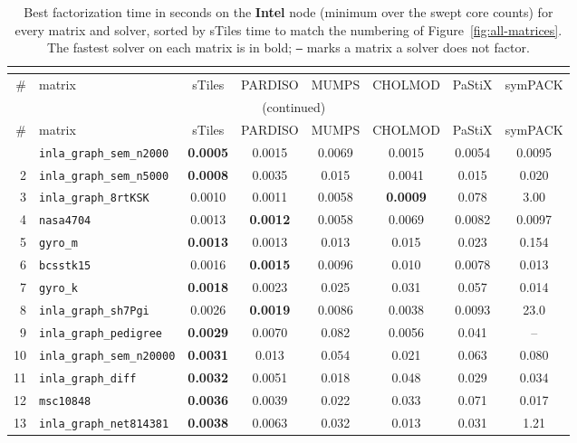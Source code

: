 \begin{footnotesize}
\setlength{\tabcolsep}{4pt}
\begin{longtable}{rl cccccc}
\caption{Best factorization time in seconds on the \textbf{Intel} node (minimum over the swept core counts) for every matrix and solver, sorted by sTiles time to match the numbering of Figure~\ref{fig:all-matrices}. The fastest solver on each matrix is in bold; \texttt{--} marks a matrix a solver does not factor.}\\
\label{tab:per-matrix-times}\\
\toprule
\# & matrix & sTiles & PARDISO & MUMPS & CHOLMOD & PaStiX & symPACK \\
\midrule
\endfirsthead
\multicolumn{8}{c}{\footnotesize\tablename~\thetable{} (continued)}\\
\toprule
\# & matrix & sTiles & PARDISO & MUMPS & CHOLMOD & PaStiX & symPACK \\
\midrule
\endhead
\bottomrule
\endfoot
1 & \texttt{inla\_graph\_sem\_n2000} & \textbf{0.0005} & 0.0015 & 0.0069 & 0.0015 & 0.0054 & 0.0095 \\
2 & \texttt{inla\_graph\_sem\_n5000} & \textbf{0.0008} & 0.0035 & 0.015 & 0.0041 & 0.015 & 0.020 \\
3 & \texttt{inla\_graph\_8rtKSK} & 0.0010 & 0.0011 & 0.0058 & \textbf{0.0009} & 0.078 & 3.00 \\
4 & \texttt{nasa4704} & 0.0013 & \textbf{0.0012} & 0.0058 & 0.0069 & 0.0082 & 0.0097 \\
5 & \texttt{gyro\_m} & \textbf{0.0013} & 0.0013 & 0.013 & 0.015 & 0.023 & 0.154 \\
6 & \texttt{bcsstk15} & 0.0016 & \textbf{0.0015} & 0.0096 & 0.010 & 0.0078 & 0.013 \\
7 & \texttt{gyro\_k} & \textbf{0.0018} & 0.0023 & 0.025 & 0.031 & 0.057 & 0.014 \\
8 & \texttt{inla\_graph\_sh7Pgi} & 0.0026 & \textbf{0.0019} & 0.0086 & 0.0038 & 0.0093 & 23.0 \\
9 & \texttt{inla\_graph\_pedigree} & \textbf{0.0029} & 0.0070 & 0.082 & 0.0056 & 0.041 & -- \\
10 & \texttt{inla\_graph\_sem\_n20000} & \textbf{0.0031} & 0.013 & 0.054 & 0.021 & 0.063 & 0.080 \\
11 & \texttt{inla\_graph\_diff} & \textbf{0.0032} & 0.0051 & 0.018 & 0.048 & 0.029 & 0.034 \\
12 & \texttt{msc10848} & \textbf{0.0036} & 0.0039 & 0.022 & 0.033 & 0.071 & 0.017 \\
13 & \texttt{inla\_graph\_net814381} & \textbf{0.0038} & 0.0063 & 0.032 & 0.013 & 0.031 & 1.21 \\

\end{longtable}
\end{footnotesize}
